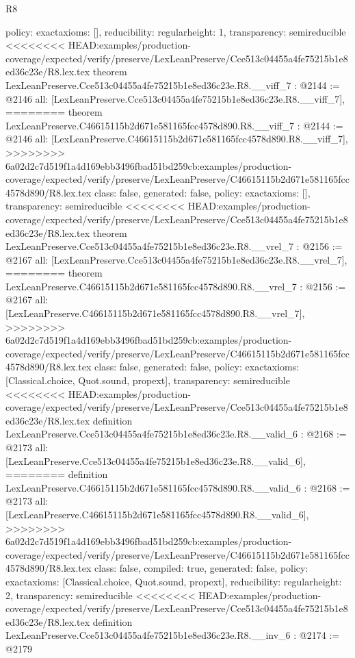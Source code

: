 \begin{lexlean}{R8}
\begin{coremodule}
{{{{{{{{  policy: exact{axioms: []},
  reducibility: regular{height: 1},
  transparency: semireducible
}
<<<<<<<< HEAD:examples/production-coverage/expected/verify/preserve/LexLeanPreserve/Cce513c04455a4fe75215b1e8ed36c23e/R8.lex.tex
theorem LexLeanPreserve.Cce513c04455a4fe75215b1e8ed36c23e.R8.__viff_7 : @2144 := @2146 {
  all: [LexLeanPreserve.Cce513c04455a4fe75215b1e8ed36c23e.R8.__viff_7],
========
theorem LexLeanPreserve.C46615115b2d671e581165fcc4578d890.R8.__viff_7 : @2144 := @2146 {
  all: [LexLeanPreserve.C46615115b2d671e581165fcc4578d890.R8.__viff_7],
>>>>>>>> 6a02d2c7d519f1a4d169ebb3496fbad51bd259cb:examples/production-coverage/expected/verify/preserve/LexLeanPreserve/C46615115b2d671e581165fcc4578d890/R8.lex.tex
  class: false,
  generated: false,
  policy: exact{axioms: []},
  transparency: semireducible
}
<<<<<<<< HEAD:examples/production-coverage/expected/verify/preserve/LexLeanPreserve/Cce513c04455a4fe75215b1e8ed36c23e/R8.lex.tex
theorem LexLeanPreserve.Cce513c04455a4fe75215b1e8ed36c23e.R8.__vrel_7 : @2156 := @2167 {
  all: [LexLeanPreserve.Cce513c04455a4fe75215b1e8ed36c23e.R8.__vrel_7],
========
theorem LexLeanPreserve.C46615115b2d671e581165fcc4578d890.R8.__vrel_7 : @2156 := @2167 {
  all: [LexLeanPreserve.C46615115b2d671e581165fcc4578d890.R8.__vrel_7],
>>>>>>>> 6a02d2c7d519f1a4d169ebb3496fbad51bd259cb:examples/production-coverage/expected/verify/preserve/LexLeanPreserve/C46615115b2d671e581165fcc4578d890/R8.lex.tex
  class: false,
  generated: false,
  policy: exact{axioms: [Classical.choice, Quot.sound, propext]},
  transparency: semireducible
}
<<<<<<<< HEAD:examples/production-coverage/expected/verify/preserve/LexLeanPreserve/Cce513c04455a4fe75215b1e8ed36c23e/R8.lex.tex
definition LexLeanPreserve.Cce513c04455a4fe75215b1e8ed36c23e.R8.__valid_6 : @2168 := @2173 {
  all: [LexLeanPreserve.Cce513c04455a4fe75215b1e8ed36c23e.R8.__valid_6],
========
definition LexLeanPreserve.C46615115b2d671e581165fcc4578d890.R8.__valid_6 : @2168 := @2173 {
  all: [LexLeanPreserve.C46615115b2d671e581165fcc4578d890.R8.__valid_6],
>>>>>>>> 6a02d2c7d519f1a4d169ebb3496fbad51bd259cb:examples/production-coverage/expected/verify/preserve/LexLeanPreserve/C46615115b2d671e581165fcc4578d890/R8.lex.tex
  class: false,
  compiled: true,
  generated: false,
  policy: exact{axioms: [Classical.choice, Quot.sound, propext]},
  reducibility: regular{height: 2},
  transparency: semireducible
}
<<<<<<<< HEAD:examples/production-coverage/expected/verify/preserve/LexLeanPreserve/Cce513c04455a4fe75215b1e8ed36c23e/R8.lex.tex
definition LexLeanPreserve.Cce513c04455a4fe75215b1e8ed36c23e.R8.__inv_6 : @2174 := @2179 {
}}}}}}}}}}}
\end{coremodule}
\end{lexlean}

